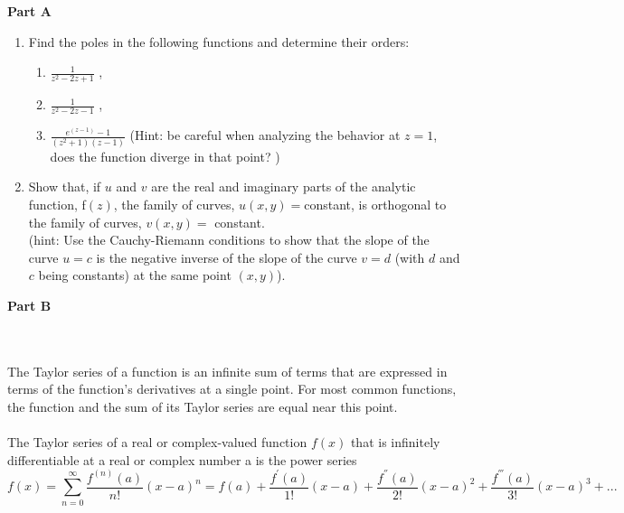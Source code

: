 \documentclass[fleqn]{article}
\begin{document}
  \textbf{Part A}
  \begin{enumerate}

    \item Find the poles in the following functions and determine their orders:
      \begin{enumerate}
        \item  $\frac{1}{z^2 - 2z + 1}$ , 
        \item  $\frac{1}{z^2 - 2z - 1}$ , 
        \item   $\frac{e^{(z-1)} - 1}{(z^2 + 1) (z - 1)}$  (Hint: be careful when analyzing the behavior at $z=1$, does the function diverge in that point? )
      \end{enumerate}

    \item Show that, if $u$ and $v$ are the real and imaginary parts of the analytic function, f$ (z)$,
    the family of curves, $u(x, y) = $constant, is orthogonal to the family of curves, $v(x, y) =$ constant.\\
    (hint: Use the Cauchy-Riemann conditions to show that the slope of the curve $u = c$ is the negative inverse of the slope of the curve $v = d$ (with $d$ and $c$ being constants) at the same point $(x, y)$). 

  \end{enumerate}

  \pagebreak

  \textbf{Part B}

    \textcolor{hwColor}{
      \\
      \\
      The Taylor series of a function is an infinite sum of terms that are expressed in terms of the function's 
      derivatives at a single point. For most common functions, the function and the sum of its Taylor series are equal near this point. \\
      \\
      The Taylor series of a real or complex-valued function $f(x)$ that is infinitely differentiable 
      at a real or complex number a is the power series 
      $$f(x)=\sum\limits_{n=0}^{\infty} \dfrac{f^{(n)}(a)}{n!} \left(x-a\right)^n=f(a)+ \dfrac{f^'(a)}{1!} \left(x-a\right)+\dfrac{f^{''}(a)}{2!} \left(x-a\right)^2+\dfrac{f^{'''}(a)}{3!} \left(x-a\right)^3+...$$
    }
\end{document}

